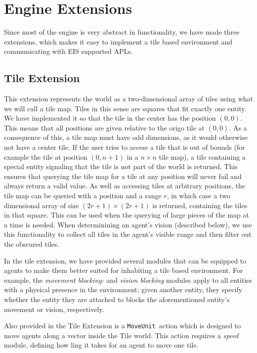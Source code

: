 
\section{Engine Extensions}

Since most of the engine is very abstract in functionality, we have
made three extensions, which makes it easy to implement a tile based
environment and communicating with EIS supported APLs.


\subsection{Tile Extension}

This extension represents the world as a two-dimensional array of
tiles using what we will call a tile map.\emph{ }Tiles in this sense
are squares that fit exactly one entity. We have implemented it so
that the tile in the center has the position $(0,0)$. This means
that all positions are given relative to the origo tile at $(0,0)$.
As a consequence of this, a tile map must have odd dimensions, as
it would otherwise not have a center tile. If the user tries to access
a tile that is out of bounds (for example the tile at position $(0,n+1)$
in a $n\times n$ tile map), a tile containing a special entity signaling
that the tile is not part of the world is returned. This ensures that
querying the tile map for a tile at any position will never fail and
always return a valid value. As well as accessing tiles at arbitrary
positions, the tile map can be queried with a position and a range
$r$, in which case a two dimensional array of size $(2r+1)\times(2r+1)$
is returned, containing the tiles in that square. This can be used
when the querying of large pieces of the map at a time is needed.
When determinining an agent's vision (described below), we use this
functionality to collect all tiles in the agent's visible range and
then filter out the obscured tiles.

In the tile extension, we have provided several modules that can be
equipped to agents to make them better suited for inhabiting a tile
based environment. For example, the \emph{movement blocking-} and
\emph{vision blocking} modules apply to all entities with a physical
presence in the environment; given another entity, they specify whether
the entity they are attached to blocks the aforementioned entity's
movement or vision, respectively. 

Also provided in the Tile Extension is a \texttt{MoveUnit }action
which is designed to move agents along a vector inside the Tile world.
This action requires a \emph{speed} module, defining how ling it takes
for an agent to move one tile.


